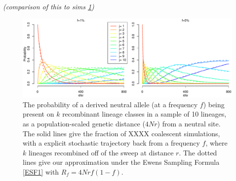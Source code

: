 \documentclass[a4paper,10pt]{article}
\newcommand{\gc}[1]{{\it \color{red} (#1)} }
\begin{document}
\gc{comparison of this to sims \ref{Prob_hap_distribution}}

\begin{figure}
	\includegraphics[width = \textwidth]{../Paper_Figures/Prob_hap_distribution.pdf}
\caption{The probability of a derived neutral allele (at a frequency $f$) being present on  $k$ recombinant lineage classes in a sample of 10 lineages, as a population-scaled genetic distance ($4Nr$) from a neutral site. The solid lines give the fraction of XXXX coalescent simulations, with a explicit stochastic trajectory back from a frequency $f$, where $k$ lineages recombined off of the sweep at distance $r$.  The dotted lines give our approximation under the Ewens Sampling Formula \eqref{ESF1} with $R_f=4Nrf(1-f)$. } \label{Prob_hap_distribution}
\end{figure}

\end{document}
